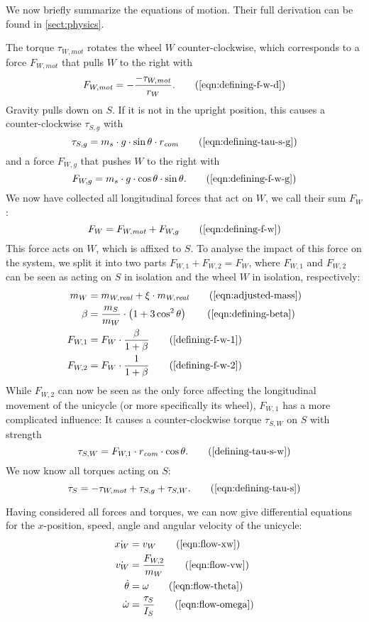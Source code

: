 \documentclass[copyright,submission]{eptcs}
\newcommand{\mi}[1]{\mathit{#1}}
\newcommand{\round}[1]{\left(#1\right)}
\begin{document}
We now briefly summarize the equations of motion. Their full
derivation can be found in \cref{sect:physics}.

The torque $\tau_{W, \mi{mot}}$ rotates the wheel $W$ counter-clockwise, which corresponds to a
force $F_{W, \mi{mot}}$ that pulls $W$ to the right with
\[ F_{W, \mi{mot}} = -\frac{-\tau_{W, \mi{mot}}}{r_W} . \tag{\ref{eqn:defining-f-w-d}} \]
Gravity pulls down on $S$. If it is not in the upright position, this causes a counter-clockwise $\tau_{S, g}$ with
\[ \tau_{S, g} = m_s \cdot g \cdot \sin \theta \cdot r_\mi{com} \tag{\ref{eqn:defining-tau-s-g}} \]
and a force $F_{W, g}$ that pushes $W$ to the right with
\[ F_{W, g} = m_s \cdot g \cdot \cos \theta \cdot \sin \theta . \tag{\ref{eqn:defining-f-w-g}} \]
We now have collected all longitudinal forces that act on $W$, we call their sum $F_W$:
\[ F_W = F_{W, \mi{mot}} + F_{W, g} \tag{\ref{eqn:defining-f-w}} \]
This force acts on $W$, which is affixed to $S$. To analyse the impact of this force on the system, we split it into two parts $F_{W,1} + F_{W,2} = F_W$, where $F_{W,1}$ and $F_{W,2}$ can be seen as acting on $S$ in isolation and the wheel $W$ in isolation, respectively:
\begin{align}
    m_W &= m_{W, \mi{real}} + \xi \cdot m_{W, \mi{real}} \tag{\ref{eqn:adjusted-mass}} \\
    \beta &= \frac{m_S}{m_W} \cdot \round{1 + 3 \cos^2 \theta} \tag{\ref{eqn:defining-beta}} \\
    F_{W,1} &= F_W \cdot \frac{\beta}{1 + \beta} \tag{\ref{defining-f-w-1}} \\
    F_{W,2} &= F_W \cdot \frac{1}{1 + \beta} \tag{\ref{defining-f-w-2}}
\end{align}
While $F_{W,2}$ can now be seen as the only force affecting the longitudinal movement of the unicycle (or more specifically its wheel), $F_{W,1}$ has a more complicated influence: It causes a counter-clockwise torque $\tau_{S,W}$ on $S$ with strength
\[ \tau_{S,W} = F_{W,1} \cdot r_\mi{com} \cdot \cos \theta . \tag{\ref{defining-tau-s-w}} \]
We now know all torques acting on $S$:
\[ \tau_S = -\tau_{W, \mi{mot}} + \tau_{S, g} + \tau_{S, W} . \tag{\ref{eqn:defining-tau-s}} \]

Having considered all forces and torques, we can now give differential equations for the $x$-position, speed, angle and angular velocity of the unicycle:
\begin{align}
\dot{x_W} &= v_W \tag{\ref{eqn:flow-xw}} \\
\dot{v_W} &= \frac{F_{W, 2}}{m_W} \tag{\ref{eqn:flow-vw}} \\
\dot{\theta} &= \omega \tag{\ref{eqn:flow-theta}} \\
\dot{\omega} &= \frac{\tau_S}{I_S} \tag{\ref{eqn:flow-omega}}
\end{align}
\end{document}
